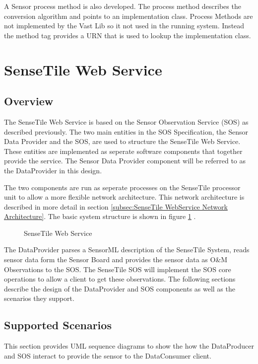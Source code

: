 \documentclass[]{final_report}
\begin{document}
A Sensor process method is also developed. The process method describes the conversion algorithm and points to an implementation class. Process Methods are not implemented by the Vast Lib so it not used in the running system. Instead the method tag provides a URN that is used to lookup the implementation class.

\section{SenseTile Web Service}
\subsection{Overview}

The SenseTile Web Service is based on the Sensor Observation Service (SOS) as described previously. The two main entities in the SOS Specification, the Sensor Data Provider and the SOS,  are used to structure the SenseTile Web Service. These entities are implemented as seperate software components that together provide the service. The Sensor Data Provider component will be referred to as the DataProvider in this design.

The two components are run as seperate processes on the SenseTile processor unit to allow a more flexible network architecture.  This network architecture is described in more detail in section \ref{subsec:SenseTile WebService Network Architecture}. The basic system structure is shown in figure \ref {fig:Deployment_sensetile} .

\begin{figure}[h]
\centering
{}
\caption{SenseTile Web Service}\label{fig:Deployment_sensetile}
\end{figure}

The DataProvider parses a SensorML description of the SenseTile System, reads sensor data form the Sensor Board and provides the sensor data as O\&M Observations to the SOS. The SenseTile SOS will implement the SOS core operations to allow a client to get these observations. The following sections describe the design of the DataProvider and SOS components as well as the scenarios they support.

\newpage
\subsection{Supported Scenarios}
This section provides UML sequence diagrams to show the how the DataProducer and SOS interact to provide the sensor to the DataConsumer client.
\end{document}
